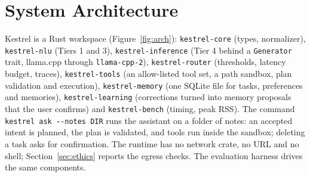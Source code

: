 \documentclass[11pt,a4paper]{article}
\begin{document}
\section{System Architecture}\label{sec:arch}

Kestrel is a Rust workspace (Figure~\ref{fig:arch}): \texttt{kestrel-core} (types, normalizer),
\texttt{kestrel-nlu} (Tiers 1 and 3), \texttt{kestrel-inference} (Tier 4 behind a \texttt{Generator} trait, llama.cpp
through \texttt{llama-cpp-2}), \texttt{kestrel-router} (thresholds, latency budget, traces),
\texttt{kestrel-tools} (an allow-listed tool set, a path sandbox, plan validation and execution),
\texttt{kestrel-memory} (one SQLite file for tasks, preferences and memories), \texttt{kestrel-learning} (corrections
turned into memory proposals that the user confirms) and \texttt{kestrel-bench} (timing, peak RSS). The command
\texttt{kestrel ask -{}-notes DIR} runs the assistant on a folder of notes: an accepted intent is planned, the plan is
validated, and tools run inside the sandbox; deleting a task asks for confirmation. The runtime has no network crate,
no URL and no shell; Section~\ref{sec:ethics} reports the egress checks. The evaluation harness drives the same
components.
\end{document}
